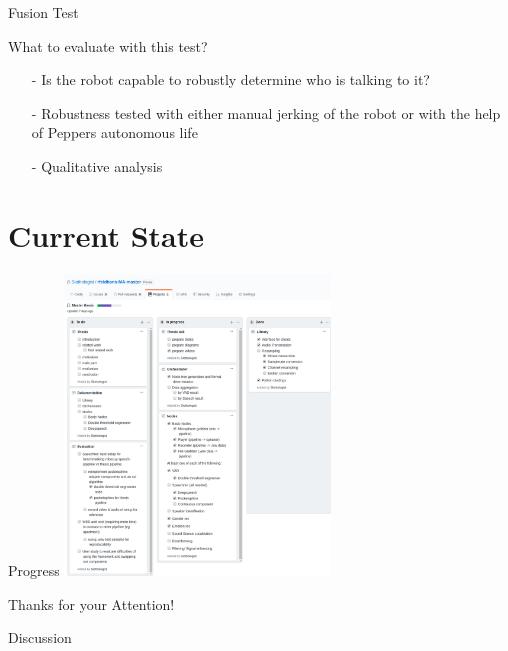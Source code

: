 \documentclass{beamer}
\begin{document}
	\begin{frame}{Fusion Test}
		\begin{alertblock}{What to evaluate with this test?}
			\pause
			\begin{itemize}
				\item[-] Is the robot capable to robustly determine who is talking to it?
				\item[-] Robustness tested with either manual jerking of the robot or with the help of Peppers autonomous life
				\item[-] Qualitative analysis 
			\end{itemize}
		\end{alertblock}
	\end{frame}
	
	
	
	
	
	
	
	\section{Current State}
	
	\begin{frame}{Progress}
		\centering
		\includegraphics[height=8cm]{Bilder/progress}
	\end{frame}
	
	
	
	
	
	
	
	\begin{frame}{}
		\begin{alertblock}{Thanks for your Attention!}
		\end{alertblock}
	\end{frame}
	
	\begin{frame}{}
		\begin{alertblock}{Discussion}
		\end{alertblock}
	\end{frame}
	
\end{document}
